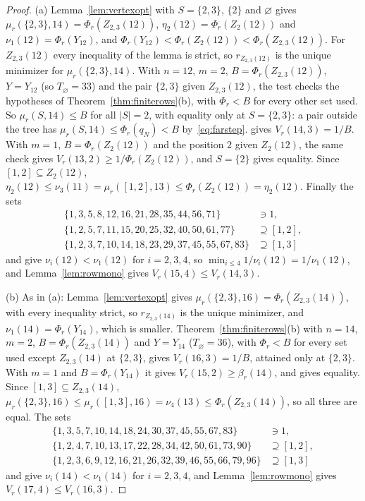 \documentclass[11pt]{article}
\begin{document}
\begin{proof}
(a) Lemma~\ref{lem:vertexopt} with $S=\{2,3\}$, $\{2\}$ and $\varnothing$
gives $\mu_r(\{2,3\},14)=\Phi_r(Z_{2,3}(12))$, $\eta_2(12)=\Phi_r(Z_2(12))$ and
$\nu_1(12)=\Phi_r(Y_{12})$, and $\Phi_r(Y_{12})<\Phi_r(Z_2(12))<\Phi_r(Z_{2,3}(12))$.
For $Z_{2,3}(12)$ every inequality of the lemma is strict, so
$r_{Z_{2,3}(12)}$ is the unique minimizer for $\mu_r(\{2,3\},14)$.
With $n=12$, $m=2$, $B=\Phi_r(Z_{2,3}(12))$, $Y=Y_{12}$ (so
$T_\varnothing=33$) and the pair $\{2,3\}$ given $Z_{2,3}(12)$, the test checks
the hypotheses of Theorem~\ref{thm:finiterows}(b), with $\Phi_r<B$ for every
other set used.  So $\mu_r(S,14)\le B$ for all $|S|=2$, with equality only
at $S=\{2,3\}$: a pair outside the tree has $\mu_r(S,14)\le\Phi_r(q_N)<B$
by~\eqref{eq:farstep}.  \cite[Proposition~2.1(b)]{coefficient-mass-rows} gives
$V_r(14,3)=1/B$.  With $m=1$, $B=\Phi_r(Z_2(12))$ and the position $2$ given
$Z_2(12)$, the same check gives $V_r(13,2)\ge1/\Phi_r(Z_2(12))$, and $S=\{2\}$ gives
equality.  Since $[1,2]\subseteq Z_2(12)$,
$\eta_2(12)\le\nu_3(11)=\mu_r([1,2],13)\le\Phi_r(Z_2(12))=\eta_2(12)$.  Finally
the sets
\begin{align*}
\{1,3,5,8,12,16,21,28,35,44,56,71\}&\ni1,\\
\{1,2,5,7,11,15,20,25,32,40,50,61,77\}&\supseteq[1,2],\\
\{1,2,3,7,10,14,18,23,29,37,45,55,67,83\}&\supseteq[1,3]
\end{align*}
and give
$\nu_i(12)<\nu_1(12)$ for $i=2,3,4$, so
$\min_{i\le4}1/\nu_i(12)=1/\nu_1(12)$, and Lemma~\ref{lem:rowmono} gives
$V_r(15,4)\le V_r(14,3)$.

(b) As in (a): Lemma~\ref{lem:vertexopt} gives
$\mu_r(\{2,3\},16)=\Phi_r(Z_{2,3}(14))$, with every inequality strict, so
$r_{Z_{2,3}(14)}$ is the unique minimizer, and $\nu_1(14)=\Phi_r(Y_{14})$, which is
smaller.  Theorem~\ref{thm:finiterows}(b) with $n=14$, $m=2$,
$B=\Phi_r(Z_{2,3}(14))$ and $Y=Y_{14}$ ($T_\varnothing=36$), with $\Phi_r<B$
for every set used except $Z_{2,3}(14)$ at $\{2,3\}$, gives $V_r(16,3)=1/B$,
attained only at $\{2,3\}$.  With $m=1$ and $B=\Phi_r(Y_{14})$ it gives
$V_r(15,2)\ge\beta_r(14)$, and \cite[Proposition~2.1(c)]{coefficient-mass-rows} gives
equality.  Since $[1,3]\subseteq Z_{2,3}(14)$,
$\mu_r(\{2,3\},16)\le\mu_r([1,3],16)=\nu_4(13)\le\Phi_r(Z_{2,3}(14))$, so all
three are equal.  The sets
\begin{align*}
\{1,3,5,7,10,14,18,24,30,37,45,55,67,83\}&\ni1,\\
\{1,2,4,7,10,13,17,22,28,34,42,50,61,73,90\}&\supseteq[1,2],\\
\{1,2,3,6,9,12,16,21,26,32,39,46,55,66,79,96\}&\supseteq[1,3]
\end{align*}
and give
$\nu_i(14)<\nu_1(14)$ for $i=2,3,4$, and Lemma~\ref{lem:rowmono} gives
$V_r(17,4)\le V_r(16,3)$.


\end{proof}
\end{document}
